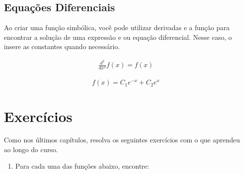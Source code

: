 \documentclass[letterpaper,10pt,english]{jupyterBook}
\begin{document}
\subsection{Equações Diferenciais}
\label{\detokenize{chapters/4:equacoes-diferenciais}}
\sphinxAtStartPar
Ao criar uma função simbólica, você pode utilizar derivadas e a função  para encontrar a solução de uma expressão e ou equação diferencial. Nesse caso, o  insere as constantes quando necessário.

\begin{sphinxVerbatim}[commandchars=\\\{\}]
  
  
\end{sphinxVerbatim}
\begin{equation*}
\begin{split}\displaystyle \frac{d^{2}}{d x^{2}} f{\left(x \right)} = f{\left(x \right)}\end{split}
\end{equation*}
\begin{sphinxVerbatim}[commandchars=\\\{\}]
\end{sphinxVerbatim}
\begin{equation*}
\begin{split}\displaystyle f{\left(x \right)} = C_{1} e^{- x} + C_{2} e^{x}\end{split}
\end{equation*}

\section{Exercícios}
\label{\detokenize{chapters/4:exercicios}}
\sphinxAtStartPar
Como nos últimos capítulos, resolva os seguintes exercícios com o que aprendeu ao longo do curso.
\begin{enumerate}
%
\item {} 
\sphinxAtStartPar
Para cada uma das funções abaixo, encontre:

\end{enumerate}
\end{document}

